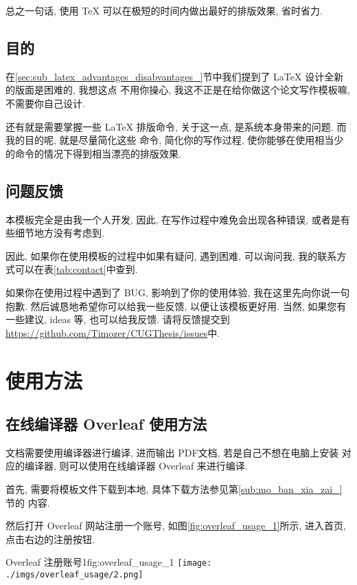 \documentclass[bibsec, master, figtoc, tabtoc]{cugthesis}
\begin{document}
总之一句话, 使用 \TeX{} 可以在极短的时间内做出最好的排版效果, 省时省力.

\section{目的}
\label{sec:mu_di_}
在\ref{sec:sub_latex_advantages_disabvantages_}节中我们提到了 \LaTeX{} 设计全新的版面是困难的, 我想这点
不用你操心, 我这不正是在给你做这个论文写作模板嘛, 不需要你自己设计.

还有就是需要掌握一些 \LaTeX{} 排版命令, 关于这一点, 是系统本身带来的问题. 而我的目的呢, 就是尽量简化这些
命令, 简化你的写作过程, 使你能够在使用相当少的命令的情况下得到相当漂亮的排版效果.

\section{问题反馈}
\label{sec:wen_ti_fan_kui_}
本模板完全是由我一个人开发, 因此, 在写作过程中难免会出现各种错误, 或者是有些细节地方没有考虑到.

因此, 如果你在使用模板的过程中如果有疑问, 遇到困难, 可以询问我, 我的联系方式可以在表\ref{tab:contact}中查到.

如果你在使用过程中遇到了 BUG, 影响到了你的使用体验, 我在这里先向你说一句抱歉.
然后诚恳地希望你可以给我一些反馈, 以便让该模板更好用. 当然, 如果您有一些建议, ideas 等, 也可以给我反馈.
请将反馈提交到
\url{https://github.com/Timozer/CUGThesis/issues}中.


\chapter{使用方法}

\section{在线编译器 Overleaf 使用方法}
\label{sec:overleaf_usage}

\LaTeXe{} 文档需要使用编译器进行编译, 进而输出 PDF文档, 若是自己不想在电脑上安装
对应的编译器, 则可以使用在线编译器 Overleaf 来进行编译.

首先, 需要将模板文件下载到本地, 具体下载方法参见第\ref{sub:mo_ban_xia_zai_} 节的
内容.

然后打开 Overleaf 网站注册一个账号, 如图\ref{fig:overleaf_usage_1}所示,
进入首页, 点击右边的注册按钮.

\begin{tfig}{Overleaf 注册账号1}{fig:overleaf_usage_1}
\texttt{[image: ./imgs/overleaf\_usage/2.png]}
\end{tfig}
\end{document}
